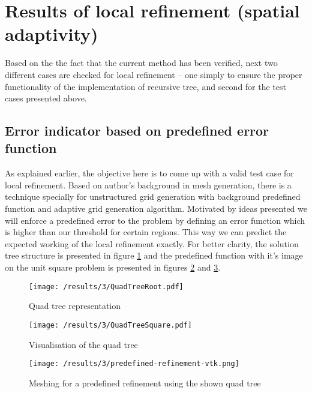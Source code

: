 \section{Results of local refinement (spatial adaptivity)}
Based on the the fact that the current method has been verified, next two different cases are checked for local refinement -- one simply to ensure the proper functionality of the implementation of recursive tree,  and second for the test cases presented above. 

\subsection{Error indicator based on predefined error function}
As explained earlier, the objective here is to come up with a valid test case for local refinement. Based on author's background in mesh generation, there is a technique specially for unstructured grid generation with background predefined function \cite{Henshaw1996} and adaptive grid generation algorithm\cite{Ebeida2010}. Motivated by ideas presented we will enforce a predefined error to the problem by defining an error function which is higher than our threshold for certain regions. This way we can predict the expected working of the local refinement exactly. For better clarity, the solution tree structure is presented in figure \ref{fig:QuadTreeRoot} and the predefined function with it's image on the unit square problem is presented in figures \ref{fig:QuadTreeSquare} and \ref{fig:PredefRefine}.\\


\begin{figure}[h]
	\centering
	    \texttt{[image: /results/3/QuadTreeRoot.pdf]}
		\centering
        \caption{Quad tree representation}
        \label{fig:QuadTreeRoot}
\end{figure}


		
\begin{figure}[h]
	\centering
	    \texttt{[image: /results/3/QuadTreeSquare.pdf]}
		\caption{Visualisation of the quad tree}
		\label{fig:QuadTreeSquare}
\end{figure}    
\begin{figure}[h]
	    \texttt{[image: /results/3/predefined-refinement-vtk.png]}
		\centering
        \caption{Meshing for a predefined refinement using the shown quad tree}
        \label{fig:PredefRefine}
\end{figure}

